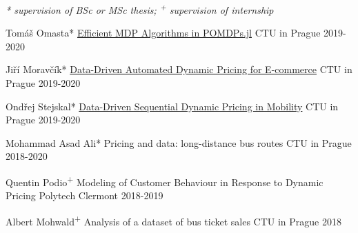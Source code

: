 
\vspace{-0.3cm}
\begin{small}\textit{* supervision of BSc or MSc thesis; \textsuperscript{+} supervision of internship}\end{small}


\begin{cvhonors}
  \cvhonor
    {Tomáš Omasta*} %
    {\href{https://dspace.cvut.cz/handle/10467/94418?locale-attribute=en}{Efficient MDP Algorithms in POMDPs.jl}} %
    {CTU in Prague} %
    {2019-2020} %

  \cvhonor
    {Jiří Moravčík*} %
    {\href{https://dspace.cvut.cz/handle/10467/94420?locale-attribute=en}{Data-Driven Automated Dynamic Pricing for E-commerce}} %
    {CTU in Prague} %
    {2019-2020} %

  \cvhonor
    {Ondřej Stejskal*} %
    {\href{https://dspace.cvut.cz/handle/10467/94413?locale-attribute=en}{Data-Driven Sequential Dynamic Pricing in Mobility}} %
    {CTU in Prague} %
    {2019-2020} %

  \cvhonor
    {Mohammad Asad Ali*} %
    {Pricing and data: long-distance bus routes} %
    {CTU in Prague} %
    {2018-2020} %

  \cvhonor
    {Quentin Podio\textsuperscript{+}} %
    {Modeling of Customer Behaviour in Response to Dynamic Pricing} %
    {\hspace{-3em}Polytech Clermont} %
    {2018-2019} %

  \cvhonor
    {Albert Mohwald\textsuperscript{+}} %
    {Analysis of a dataset of bus ticket sales} %
    {CTU in Prague} %
    {2018} %

\end{cvhonors}
